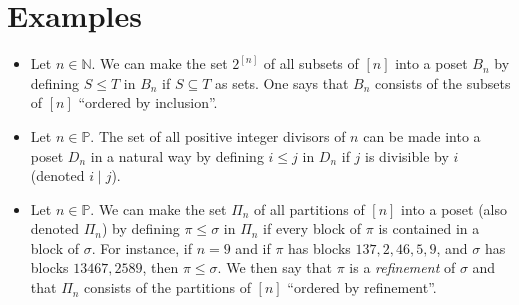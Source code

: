 \section{Examples}


\begin{itemize}
\item Let $n \in \mathbb{N}$. We can make the set $2^{[n]}$ of all subsets of $[n]$ into a poset $B_n$ by defining $S \leq T$ in $B_n$ if $S \subseteq T$ as sets. One says that $B_n$ consists of the subsets of $[n]$ ``ordered by inclusion''. \cite{Stanley:2011:ECV:2124415}
\item Let $n \in \mathbb{P}$. The set of all positive integer divisors of $n$ can be made into a poset $D_n$ in a natural way by defining $i \leq j$ in $D_n$ if $j$ is divisible by $i$ (denoted $i \mid j$). \cite{Stanley:2011:ECV:2124415}
\item Let $n \in \mathbb{P}$. We can make the set $\Pi_n$ of all partitions of $[n]$ into a poset (also denoted $\Pi_n$) by defining $\pi \leq \sigma$ in $\Pi_n$ if every block of $\pi$ is contained in a block of $\sigma$. For instance, if $n = 9$ and if $\pi$ has blocks $137, 2, 46, 5, 9$, and $\sigma$ has blocks $13467, 2589$, then $\pi \leq \sigma$. We then say that $\pi$ is a \emph{refinement} of $\sigma$ and that $\Pi_n$ consists of the partitions of $[n]$ ``ordered by refinement''.  \cite{Stanley:2011:ECV:2124415}
\end{itemize}